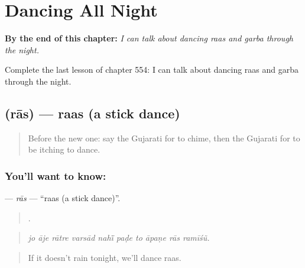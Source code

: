 
\chapter{Dancing All Night}
\label{ch:gu-dancing-all-night}

\begin{chapteropening}
\textbf{By the end of this chapter:} \emph{I can talk about dancing raas and garba through the night.}

Complete the last lesson of chapter 554: I can talk about dancing raas and garba through the night.
\end{chapteropening}

\section[\texorpdfstring{\gu{રાસ} (rās)}{રાસ (rās)}]{ (rās) — raas (a stick dance)}

\label{lesson:GU-C554-ras}



\begin{quote}
Before the new one: say the Gujarati for to chime, then the Gujarati for to be itching to dance.
\end{quote}

\subsection*{You'll want to know: }
\textbf{} — \emph{rās} — \textquotedblleft{}raas (a stick dance)\textquotedblright{}.

\begin{quote}
         .
\end{quote}

\begin{quote}
\emph{jo āje rātre varsād nahī̃ paḍe to āpaṇe rās ramīśũ.}
\end{quote}

\begin{quote}
If it doesn't rain tonight, we'll dance raas.
\end{quote}

